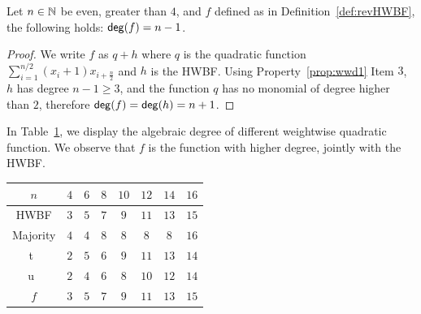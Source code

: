 \documentclass[11pt]{llncs}
\begin{document}


\begin{proposition}
	Let $n\in \mathbb{N}$ be even, greater than $4$, and $f$ defined as in Definition~\ref{def:revHWBF}, the following holds: $\mathsf{deg}(f)= n-1$.
\end{proposition}
\begin{proof}
	We write $f$ as $q+h$ where $q$ is the quadratic function $\sum_{i=1}^{n/2} (x_i+1) x_{i+\frac{n}{2}}$ and $h$ is the HWBF.
	Using Property~\ref{prop:wwd1} Item $3$, $h$ has degree $n-1\ge 3$, and the function $q$ has no monomial of degree higher than $2$, therefore $\mathsf{deg}(f)=\mathsf{deg}(h)=n+1$.
	
	
\end{proof}


In Table~\ref{table:comparisonsDeg}, we display the algebraic degree of different weightwise quadratic function. We observe that $f$ is the function with higher degree, jointly with the HWBF. 

\begin{table}[h]
	\centering
	\begin{tabular}{|c| c|c|c|c| c|c|c|}
		\hline
		$n$ & $4$  & $6$  & $8$  &  $10$ & $12$ & $14$ & $16$  \\
		\hline	
		HWBF   & $3$  & $5$  & $7$  &  $9$ & $11$ & $13$ & $15$  \\  	
		\hline
		Majority   & $4$  & $4$  & $8$  &  $8$ & $8$ & $8$ & $16$  \\
		\hline
		t~\cite{DAM:MeaOza24}   & $2$  & $5$  & $6$  &  $9$ & $11$ & $13$ & $14$\\
		\hline	
		u~\cite{DAM:MeaOza24}   & $2$  & $4$  & $6$  &  $8$ & $10$ & $12$ & $14$ \\
		\hline				
		
		$f$  & $3$  & $5$  & $7$  &  $9$ & $11$ & $13$ & $15$\\
		\hline
	\end{tabular}
	\label{table:comparisonsDeg}
\end{table}



\end{document}
